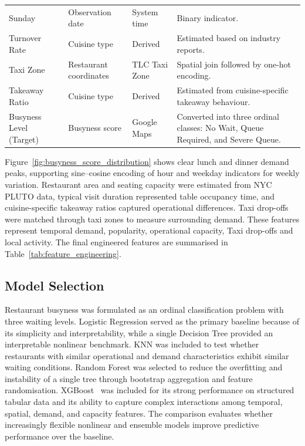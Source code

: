\documentclass[conference]{IEEEtran}
\begin{document}
\begin{table}[!t]
\begin{tabularx}{\textwidth}{
        >{\raggedright\arraybackslash}p{2.8cm}
        >{\raggedright\arraybackslash}p{3.2cm}
        >{\raggedright\arraybackslash}p{2.5cm}
        >{\raggedright\arraybackslash}X
    }
        Sunday &
        Observation date &
        System time &
        Binary indicator. \\

        Turnover Rate &
        Cuisine type &
        Derived &
        Estimated based on industry reports. \\

        Taxi Zone &
        Restaurant coordinates &
        TLC Taxi Zone &
        Spatial join followed by one-hot encoding. \\

        Takeaway Ratio &
        Cuisine type &
        Derived &
        Estimated from cuisine-specific takeaway behaviour. \\

        Busyness Level (Target) &
        Busyness score &
        Google Maps &
        Converted into three ordinal classes: No Wait, Queue Required, and Severe Queue. \\

        \bottomrule
    \end{tabularx}
\end{table}

Figure~\ref{fig:busyness_score_distribution} shows clear lunch and dinner demand peaks, supporting sine--cosine encoding of hour and weekday indicators for weekly variation. Restaurant area and seating capacity were estimated from NYC PLUTO data, typical visit duration represented table occupancy time, and cuisine-specific takeaway ratios captured operational differences. Taxi drop-offs were matched through taxi zones to measure surrounding demand. These features represent temporal demand, popularity, operational capacity, Taxi drop-offs and local activity. The final engineered features are summarised in Table~\ref{tab:feature_engineering}.

\subsection{Model Selection}

Restaurant busyness was formulated as an ordinal classification problem with three waiting levels. Logistic Regression served as the primary baseline because of its simplicity and interpretability, while a single Decision Tree provided an interpretable nonlinear benchmark. KNN was included to test whether restaurants with similar operational and demand characteristics exhibit similar waiting conditions. Random Forest was selected to reduce the overfitting and instability of a single tree through bootstrap aggregation and feature randomisation. XGBoost~\cite{chen2016xgboost} was included for its strong performance on structured tabular data and its ability to capture complex interactions among temporal, spatial, demand, and capacity features. The comparison evaluates whether increasingly flexible nonlinear and ensemble models improve predictive performance over the baseline.
\end{document}
